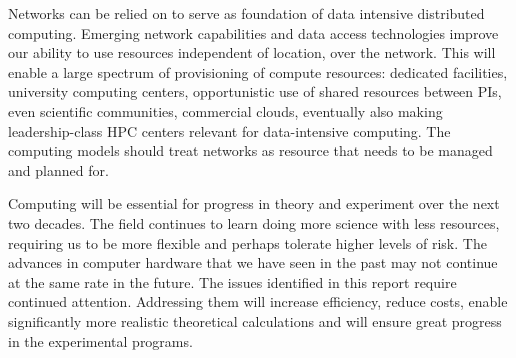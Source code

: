Networks can be relied on to serve as foundation of data intensive
distributed computing. Emerging network capabilities and data access
technologies improve our ability to use resources independent of location,
over the network. This will enable a large spectrum of provisioning of
compute resources: dedicated facilities, university computing centers,
opportunistic use of shared resources between PIs, even scientific
communities, commercial clouds, eventually also making leadership-class HPC
centers relevant for data-intensive computing. The computing models should
treat networks as resource that needs to be managed and planned for.

Computing will be essential for progress in theory and experiment over the
next two decades. The field continues to learn doing more science with less
resources, requiring us to be more flexible and perhaps tolerate higher
levels of risk. The advances in computer hardware that we have seen in the
past may not continue at the same rate in the future. The issues identified
in this report require continued attention. Addressing them will increase
efficiency, reduce costs, enable significantly more realistic theoretical
calculations and will ensure great progress in the experimental programs.

